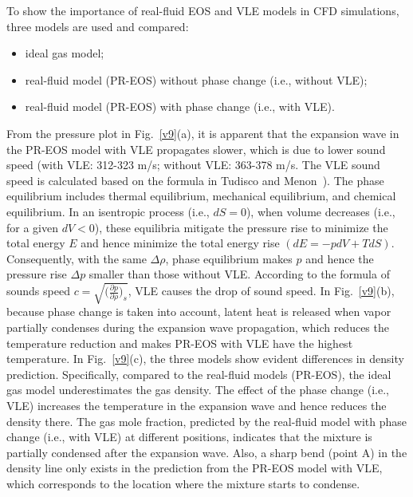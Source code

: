 To show the importance of real-fluid EOS and VLE models in CFD simulations, three models are used and compared:
\begin{itemize}
    \item ideal gas model;
    \item real-fluid model (PR-EOS) without phase change (i.e., without VLE);
    \item real-fluid model (PR-EOS) with phase change (i.e., with VLE).
\end{itemize} %
From the pressure plot in Fig.~\ref{v9}(a), it is apparent that the expansion wave in the PR-EOS model with VLE propagates slower, which is due to lower sound speed (with VLE: 312-323 m/s; without VLE: 363-378 m/s. The VLE sound speed is calculated based on the formula in Tudisco and Menon~\cite{tudisco2020analytical}). The phase equilibrium includes thermal equilibrium, mechanical equilibrium, and chemical equilibrium. In an isentropic process (i.e., $dS=0$), when volume decreases (i.e., for a given $dV<0$), these equilibria mitigate the pressure rise to minimize the total energy $E$ and hence minimize the total energy rise $(dE = -pdV + TdS)$. Consequently, with the same $\Delta\rho$, phase equilibrium makes $p$ and hence the pressure rise $\Delta p$ smaller than those without VLE. According to the formula of sounds speed $c=\sqrt{\Big(\frac{\partial p}{\partial \rho}\Big)_s}$, VLE causes the drop of sound speed.
In Fig.~\ref{v9}(b), because phase change is taken into account, latent heat is released when vapor partially condenses during the expansion wave propagation, which reduces the temperature reduction and makes PR-EOS with VLE have the highest temperature. In Fig.~\ref{v9}(c), the three models show evident differences in density prediction. Specifically, compared to the real-fluid models (PR-EOS), the ideal gas model underestimates the gas density. The effect of the phase change (i.e., VLE) increases the temperature in the expansion wave and hence reduces the density there. The gas mole fraction, predicted by the real-fluid model with phase change (i.e., with VLE) at different positions, indicates that the mixture is partially condensed after the expansion wave. Also, a sharp bend (point A) in the density line only exists in the prediction from the PR-EOS model with VLE, which corresponds to the location where the mixture starts to condense.

